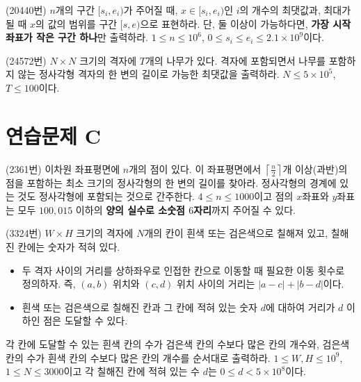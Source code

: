 \begin{problem} 
    (20440번) $n$개의 구간 $[s_i, e_i)$가 주어질 때, $x \in [s_i, e_i)$인 $i$의 개수의 최댓값과, 최대가 될 때 $x$의 값의 범위를 구간 $[s, e)$으로 표현하라. 단, 둘 이상이 가능하다면, \textbf{가장 시작 좌표가 작은 구간 하나}만 출력하라. $1 \leq n \leq 10^6$, $0 \leq s_i \leq e_i \leq 2.1 \times 10^9$이다.
\end{problem}

\begin{problem}
    (24572번) $N \times N$ 크기의 격자에 $T$개의 나무가 있다. 격자에 포함되면서 나무를 포함하지 않는 정사각형 격자의 한 변의 길이로 가능한 최댓값을 출력하라. $N \leq 5 \times 10^5$, $T \leq 100$이다.
\end{problem}

\section{연습문제 C}

\begin{problem}
    (2361번) 이차원 좌표평면에 $n$개의 점이 있다. 이 좌표평면에서 $\left\lceil \frac{n}{2} \right\rceil$개 이상(과반)의 점을 포함하는 최소 크기의 정사각형의 한 변의 길이를 찾아라. 정사각형의 경계에 있는 것도 정사각형에 포함되는 것으로 간주한다. $4 \leq n \leq 1000$이고 점의 $x$좌표와 $y$좌표는 모두 $100,015$ 이하의 \textbf{양의 실수로 소숫점 $6$자리}까지 주어질 수 있다.
\end{problem}

\begin{problem}
    (3324번) $W \times H$ 크기의 격자에 $N$개의 칸이 흰색 또는 검은색으로 칠해져 있고, 칠해진 칸에는 숫자가 적혀 있다.
    \begin{itemize}
        \item 두 격자 사이의 거리를 상하좌우로 인접한 칸으로 이동할 때 필요한 이동 횟수로 정의하자. 즉, $(a, b)$ 위치와 $(c, d)$ 위치 사이의 거리는 $|a-c| + |b-d|$이다. 
        \item 흰색 또는 검은색으로 칠해진 칸과 그 칸에 적혀 있는 숫자 $d$에 대하여 거리가 $d$ 이하인 점은 도달할 수 있다.
    \end{itemize}
    각 칸에 도달할 수 있는 흰색 칸의 수가 검은색 칸의 수보다 많은 칸의 개수와, 검은색 칸의 수가 흰색 칸의 수보다 많은 칸의 개수를 순서대로 출력하라. $1 \leq W, H \leq 10^9$, $1 \leq N \leq 3000$이고 각 칠해진 칸에 적혀 있는 수 $d$는 $0 \leq d < 5 \times 10^8$이다.
\end{problem}

